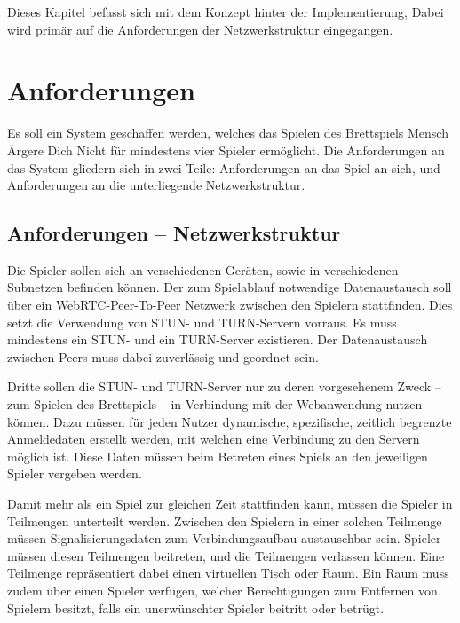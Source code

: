 Dieses Kapitel befasst sich mit dem Konzept hinter der Implementierung, Dabei wird primär auf die Anforderungen der Netzwerkstruktur eingegangen.

\section{Anforderungen}
Es soll ein System geschaffen werden, welches das Spielen des Brettspiels \glqq{}Mensch Ärgere Dich Nicht\grqq{} für mindestens vier Spieler ermöglicht. Die Anforderungen an das System gliedern sich in zwei Teile: Anforderungen an das Spiel an sich, und Anforderungen an die unterliegende Netzwerkstruktur.\par

\subsection{Anforderungen -- Netzwerkstruktur}
Die Spieler sollen sich an verschiedenen Geräten, sowie in verschiedenen Subnetzen befinden können. Der zum Spielablauf notwendige Datenaustausch soll über ein \acs{WebRTC}-Peer-To-Peer Netzwerk zwischen den Spielern stattfinden. Dies setzt die Verwendung von STUN- und TURN-Servern vorraus. Es muss mindestens ein STUN- und ein TURN-Server existieren. Der Datenaustausch zwischen Peers muss dabei zuverlässig und geordnet sein.\par

Dritte sollen die STUN- und TURN-Server nur zu deren vorgesehenem Zweck -- zum Spielen des Brettspiels -- in Verbindung mit der Webanwendung nutzen können. Dazu müssen für jeden Nutzer dynamische, spezifische, zeitlich begrenzte Anmeldedaten erstellt werden, mit welchen eine Verbindung zu den Servern möglich ist. Diese Daten müssen beim Betreten eines Spiels an den jeweiligen Spieler vergeben werden.\par

\label{section:weitere}
Damit mehr als ein Spiel zur gleichen Zeit stattfinden kann, müssen die Spieler in Teilmengen unterteilt werden. Zwischen den Spielern in einer solchen Teilmenge müssen Signalisierungsdaten zum Verbindungsaufbau austauschbar sein. Spieler müssen diesen Teilmengen beitreten, und die Teilmengen verlassen können. Eine Teilmenge repräsentiert dabei einen virtuellen \glqq{}Tisch\grqq{} oder \glqq{}Raum\grqq{}. Ein \glqq{}Raum\grqq{} muss zudem über einen Spieler verfügen, welcher Berechtigungen zum Entfernen von Spielern besitzt, falls ein unerwünschter Spieler beitritt oder betrügt.\par

